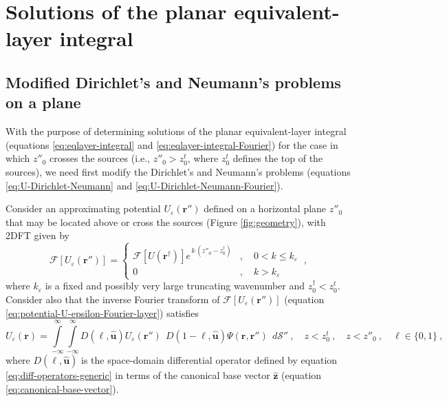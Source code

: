 \section{Solutions of the planar equivalent-layer integral}
\label{sec:existence}

\subsection{Modified Dirichlet's and Neumann's problems on a plane}

With the purpose of determining solutions of the planar equivalent-layer integral 
(equations \ref{eq:eqlayer-integral} and \ref{eq:eqlayer-integral-Fourier}) for the case in which $z''_{0}$ 
crosses the sources (i.e., $z''_{0} > z^{t}_{0}$, where $z^{t}_{0}$ defines the top of the sources), 
we need first modify the Dirichlet's and Neumann's problems
(equations \ref{eq:U-Dirichlet-Neumann} and \ref{eq:U-Dirichlet-Neumann-Fourier}).

Consider an approximating potential $U_{\varepsilon}(\mathbf{r}'')$ defined on a horizontal 
plane $z''_{0}$ that may be located above or cross 
the sources (Figure \ref{fig:geometry}), with 2DFT given by
\begin{equation}
	\mathcal{F} \left[ U_{\varepsilon}(\mathbf{r}'') \right] = 
	\begin{cases}
		\mathcal{F} \left[ U(\mathbf{r}^{\dagger}) \right] 
		e^{\, k \, (z''_{0} - z^{\dagger}_{0})} & , 
		\quad 0 < k \le k_{\varepsilon} \\
		0 & , \quad k > k_{\varepsilon} 
	\end{cases} \: ,
	\label{eq:potential-U-epsilon-Fourier-layer}
\end{equation}
where $k_{\varepsilon}$ is a fixed and possibly very large truncating wavenumber and $z^{\dagger}_{0} < z^{t}_{0}$. 
Consider also that the inverse Fourier transform of $\mathcal{F} \left[ U_{\varepsilon}(\mathbf{r}'') \right]$ 
(equation \ref{eq:potential-U-epsilon-Fourier-layer}) satisfies
\begin{equation}
	U_{\varepsilon}(\mathbf{r}) = 
	\int\limits_{-\infty}^{\infty} \int\limits_{-\infty}^{\infty}
	D(\ell, \hat{\mathbf{u}}) U_{\varepsilon}(\mathbf{r}'') \:\:
	D(1-\ell, \hat{\mathbf{u}}) \Psi(\mathbf{r}, \mathbf{r}'') 
	\:\: d\mathcal{S}'' \: , 
	\quad z < z^{t}_{0} \: , \quad z < z''_{0} \: ,
	\quad \ell \in \{ 0, 1 \} \: ,
	\label{eq:potential-U-epsilon-space}
\end{equation}
where $D(\ell, \hat{\mathbf{u}})$ is the space-domain differential operator 
defined by equation \ref{eq:diff-operators-generic} in terms of the canonical base vector 
$\hat{\mathbf{z}}$ (equation \ref{eq:canonical-base-vector}).

